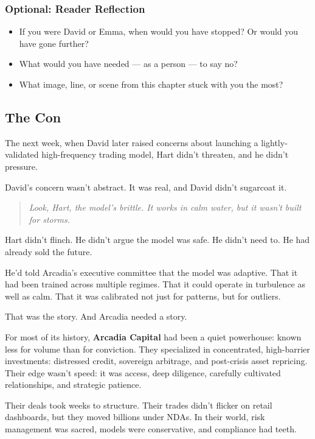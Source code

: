 \subsubsection{Optional: Reader Reflection}

\begin{itemize}
  \item If you were David or Emma, when would you have stopped? Or would you have gone further?
  \item What would you have needed — as a person — to say no?
  \item What image, line, or scene from this chapter stuck with you the most?
\end{itemize}




\subsection{The Con}

The next week, when David later raised concerns about launching a lightly-validated high-frequency trading model, 
Hart didn’t threaten, and he didn’t pressure.

David's concern wasn’t abstract. It was real, and David didn’t sugarcoat it.

\begin{quote}
\textit{Look, Hart, the model’s brittle. It works in calm water, but it wasn’t built for storms.}
\end{quote}

Hart didn’t flinch. He didn’t argue the model was safe.
He didn’t need to. He had already sold the future.

He’d told Arcadia’s executive committee that the model was adaptive.
That it had been trained across multiple regimes.
That it could operate in turbulence as well as calm. That it was calibrated not just for patterns, but for outliers.

That was the story. And Arcadia needed a story.

For most of its history, \textbf{Arcadia Capital} had been a quiet powerhouse: known less for volume than for conviction.
They specialized in concentrated, high-barrier investments: distressed credit, sovereign arbitrage, and post-crisis asset repricing.
Their edge wasn’t speed: it was access, deep diligence, carefully cultivated relationships, and strategic patience.

Their deals took weeks to structure.
Their trades didn’t flicker on retail dashboards, but they moved billions under NDAs.
In their world, risk management was sacred, models were conservative, and compliance had teeth.

